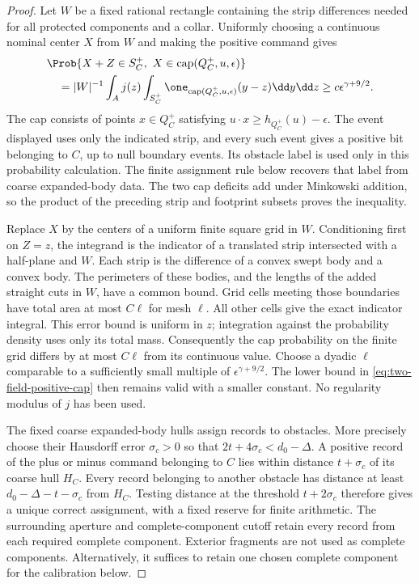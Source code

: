 \begin{proof}
Let $W$ be a fixed rational rectangle containing the strip differences
needed for all protected components and a collar.  Uniformly choosing
a continuous nominal center $X$ from $W$ and making the positive
command gives
\begin{align}
 &\Prob\{X+Z\in S_C^+,\ X\in\operatorname{cap}(Q_C^+,u,\epsilon)\}
       \nonumber\\
 &\quad=|W|^{-1}\int_Aj(z)
       \int_{S_C^+}\one_{\operatorname{cap}(Q_C^+,u,\epsilon)}(y-z)
                                         \dd y\dd z
       \ge c\epsilon^{\gamma+9/2}.
       \label{eq:two-field-positive-cap}
\end{align}
The cap consists of points $x\in Q_C^+$ satisfying
$u\cdot x\ge h_{Q_C^+}(u)-\epsilon$.  The event displayed uses
only the indicated strip, and every such event gives a positive bit
belonging to $C$, up to null boundary events.  Its obstacle label is
used only in this probability calculation.  The finite assignment
rule below recovers that label from coarse expanded-body data.
The two cap deficits add under Minkowski addition, so
the product of the preceding strip and footprint subsets proves the
inequality.

Replace $X$ by the centers of a uniform finite square grid in $W$.
Conditioning first on $Z=z$, the integrand is the indicator of a
translated strip intersected with a half-plane and $W$.  Each strip
is the difference of a convex swept body and a convex body.  The
perimeters of these bodies, and the lengths of the added straight
cuts in $W$, have a common bound.  Grid cells meeting those
boundaries have total area at most $C\ell$ for mesh $\ell$.
All other cells give the exact indicator integral.  This error bound
is uniform in $z$; integration against the probability density uses
only its total mass.  Consequently the cap probability on the finite
grid differs by at most $C\ell$ from its continuous value.
Choose a dyadic $\ell$ comparable to a sufficiently small multiple
of $\epsilon^{\gamma+9/2}$.  The lower bound in
\eqref{eq:two-field-positive-cap} then remains valid with a smaller
constant.  No regularity modulus of $j$ has been used.

The fixed coarse expanded-body hulls assign records to obstacles.
More precisely choose their Hausdorff error $\sigma_c>0$ so that
$2t+4\sigma_c<d_0-\Delta$.  A positive record of the plus or minus
command belonging to $C$ lies within distance $t+\sigma_c$ of its
coarse hull $H_C$.  Every record belonging to another obstacle has
distance at least $d_0-\Delta-t-\sigma_c$ from $H_C$.
Testing distance at the threshold $t+2\sigma_c$ therefore gives a
unique correct assignment, with a fixed reserve for finite arithmetic.
The surrounding aperture and complete-component cutoff retain every
record from each required complete component.  Exterior fragments are
not used as complete components.  Alternatively, it suffices to retain
one chosen complete component for the calibration below.


\end{proof}

